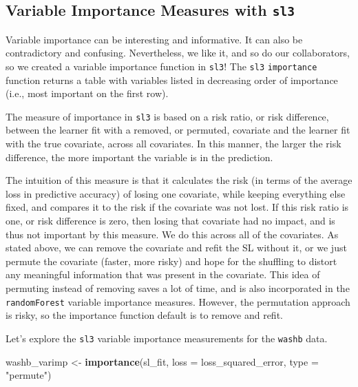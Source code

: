 \documentclass[12pt, krantz2,]{krantz}
\newenvironment{Shaded}{\begin{snugshade}}{\end{snugshade}}
\newcommand{\DataTypeTok}[1]{\textcolor[rgb]{0.27,0.27,0.27}{#1}}
\newcommand{\KeywordTok}[1]{\textcolor[rgb]{0.27,0.27,0.27}{\textbf{#1}}}
\newcommand{\NormalTok}[1]{#1}
\newcommand{\StringTok}[1]{\textcolor[rgb]{0.5,0.5,0.5}{#1}}
\theoremstyle{definition}
\theoremstyle{definition}
\theoremstyle{definition}
\newcommand{\1}{\mathbbm{1}}
\begin{document}
\hypertarget{variable-importance-measures-with-sl3}{%
\subsection*{\texorpdfstring{Variable Importance Measures with \texttt{sl3}}{Variable Importance Measures with sl3}}\label{variable-importance-measures-with-sl3}}


Variable importance can be interesting and informative. It can also be
contradictory and confusing. Nevertheless, we like it, and so do our
collaborators, so we created a variable importance function in \texttt{sl3}! The \texttt{sl3}
\texttt{importance} function returns a table with variables listed in decreasing order
of importance (i.e., most important on the first row).

The measure of importance in \texttt{sl3} is based on a risk ratio, or risk
difference, between the learner fit with a removed, or permuted, covariate and
the learner fit with the true covariate, across all covariates. In this manner,
the larger the risk difference, the more important the variable is in the
prediction.

The intuition of this measure is that it calculates the risk (in terms of the
average loss in predictive accuracy) of losing one covariate, while keeping
everything else fixed, and compares it to the risk if the covariate was not
lost. If this risk ratio is one, or risk difference is zero, then losing that
covariate had no impact, and is thus not important by this measure. We do this
across all of the covariates. As stated above, we can remove the covariate and
refit the SL without it, or we just permute the covariate (faster, more risky)
and hope for the shuffling to distort any meaningful information that was
present in the covariate. This idea of permuting instead of removing saves a
lot of time, and is also incorporated in the \texttt{randomForest} variable importance
measures. However, the permutation approach is risky, so the importance
function default is to remove and refit.

Let's explore the \texttt{sl3} variable importance measurements for the \texttt{washb} data.

\begin{Shaded}
\begin{Highlighting}[]
\NormalTok{washb_varimp <-}\StringTok{ }\KeywordTok{importance}\NormalTok{(sl_fit, }\DataTypeTok{loss =}\NormalTok{ loss_squared_error, }\DataTypeTok{type =} \StringTok{"permute"}\NormalTok{)}
\end{Highlighting}
\end{Shaded}
\end{document}
